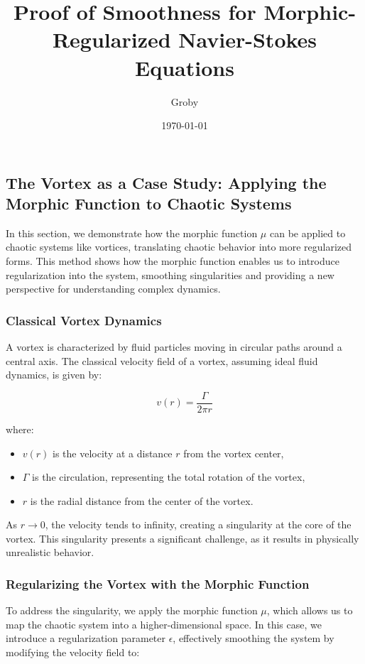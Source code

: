 \documentclass{article}
\title{Proof of Smoothness for Morphic-Regularized Navier-Stokes Equations}
\author{Groby}
\date{\today}
\begin{document}
\maketitle
\subsection{The Vortex as a Case Study: Applying the Morphic Function to Chaotic Systems}

In this section, we demonstrate how the morphic function \( \mu \) can be applied to chaotic systems like vortices, translating chaotic behavior into more regularized forms. This method shows how the morphic function enables us to introduce regularization into the system, smoothing singularities and providing a new perspective for understanding complex dynamics.

\subsubsection{Classical Vortex Dynamics}

A vortex is characterized by fluid particles moving in circular paths around a central axis. The classical velocity field of a vortex, assuming ideal fluid dynamics, is given by:

\[
v(r) = \frac{\Gamma}{2\pi r}
\]

where:
\begin{itemize}
    \item \( v(r) \) is the velocity at a distance \( r \) from the vortex center,
    \item \( \Gamma \) is the circulation, representing the total rotation of the vortex,
    \item \( r \) is the radial distance from the center of the vortex.
\end{itemize}

As \( r \to 0 \), the velocity tends to infinity, creating a singularity at the core of the vortex. This singularity presents a significant challenge, as it results in physically unrealistic behavior.

\subsubsection{Regularizing the Vortex with the Morphic Function}

To address the singularity, we apply the morphic function \( \mu \), which allows us to map the chaotic system into a higher-dimensional space. In this case, we introduce a regularization parameter \( \epsilon \), effectively smoothing the system by modifying the velocity field to:
\end{document}
